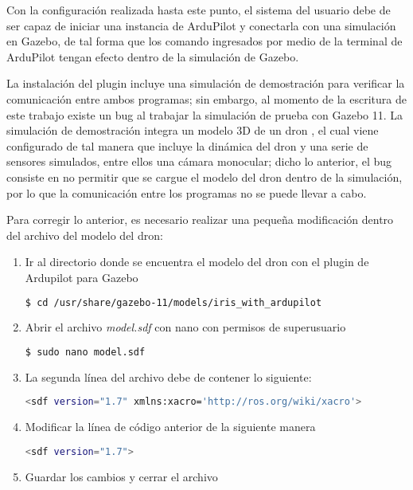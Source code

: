 Con la configuración realizada hasta este punto, el sistema del usuario debe de ser capaz de iniciar una instancia de ArduPilot y conectarla con una simulación en Gazebo, de tal forma que los comando ingresados por medio de la terminal de ArduPilot tengan efecto dentro de la simulación de Gazebo. 

La instalación del plugin incluye una simulación de demostración para verificar la comunicación entre ambos programas; sin embargo, al momento de la escritura de este trabajo existe un bug al trabajar la simulación de prueba con Gazebo 11. 
La simulación de demostración integra un modelo 3D de un dron , el cual viene configurado de tal manera que incluye la dinámica del dron y una serie de sensores simulados, entre ellos una cámara monocular; dicho lo anterior, el bug consiste en no permitir que se cargue el modelo del dron dentro de la simulación, por lo que la comunicación entre los programas no se puede llevar a cabo.

Para corregir lo anterior, es necesario realizar una pequeña modificación dentro del archivo del modelo del dron:

\begin{enumerate}
    \item Ir al directorio donde se encuentra el modelo del dron con el plugin de Ardupilot para Gazebo
    \begin{lstlisting}[language = bash]
        $ cd /usr/share/gazebo-11/models/iris_with_ardupilot
    \end{lstlisting} 
    \item Abrir el archivo \textit{model.sdf} con nano con permisos de superusuario
    \begin{lstlisting}[language = bash]
        $ sudo nano model.sdf
    \end{lstlisting} 
    \item La segunda línea del archivo debe de contener lo siguiente:
    \begin{lstlisting}[language = bash]
        <sdf version="1.7" xmlns:xacro='http://ros.org/wiki/xacro'>
    \end{lstlisting} 
    \item Modificar la línea de código anterior de la siguiente manera
    \begin{lstlisting}[language = bash]
        <sdf version="1.7">
    \end{lstlisting}  
    \item Guardar los cambios y cerrar el archivo
\end{enumerate}

